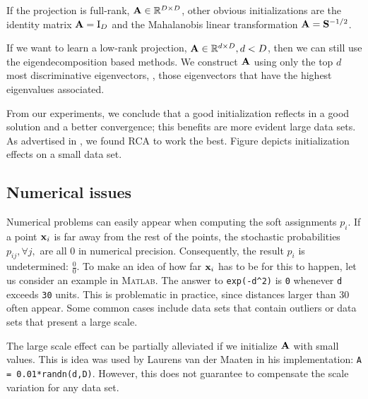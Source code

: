        If the projection is full-rank, $\mathbf{A}\in\mathbb{R}^{D\times D}$, other obvious initializations are the identity matrix $\mathbf{A}=\mathrm{I}_D$ and the Mahalanobis linear transformation $\mathbf{A}=\mathbf{S}^{-1/2}$.

	If we want to learn a low-rank projection, $\mathbf{A} \in \mathbb{R}^{d\times D},d<D$, then we can still use the eigendecomposition based methods. We construct $\mathbf{A}$ using only the top $d$ most
        discriminative eigenvectors, \ie, those eigenvectors that have the
        highest eigenvalues associated.

        From our experiments, we conclude that a good
        initialization reflects in a good solution and a better convergence; this benefits are more evident
        large data sets. As advertised in , we found RCA to work the best. Figure depicts initialization effects on a small data set.

\subsection{Numerical issues}
\label{subsec:numerical-issues}

	Numerical problems can easily appear when computing the soft assignments $p_i$. If a point
        $\mathbf{x}_i$ is far away from the rest of the points, the stochastic probabilities $p_{ij}, \forall j,$ are all 0 in numerical precision. Consequently, the result $p_i$ is undetermined: $\frac{0}{0}$. 
	To make an idea of how far $\mathbf{x}_i$ has to be for this to happen, let us consider an example in \textsc{Matlab}. The answer to 
        \texttt{exp(-d\^{}2)} is \texttt{0} whenever \texttt{d} exceeds \texttt{30} units.
	This is problematic in practice, since distances larger than 30 often appear. Some common cases include data sets that contain outliers or data sets that present a large scale. 

	The large scale effect can be partially alleviated if we initialize $\mathbf{A}$ with small values. This is idea was used by Laurens van der Maaten in his implementation: \texttt{A = 0.01*randn(d,D)}. However, this does not guarantee to compensate the scale variation for any data set.


